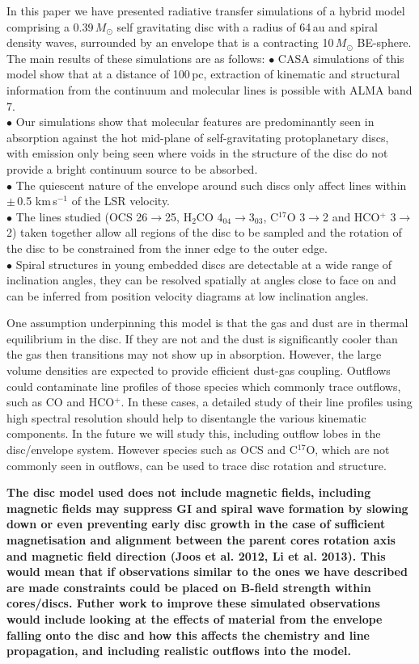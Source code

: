 \documentclass[useAMS,usenatbib]{mn2e}
\begin{document}
In this paper we have presented radiative transfer simulations of a hybrid model comprising a 0.39$\, M_\odot$ self gravitating disc with a radius of 64$\,$au and spiral density waves, surrounded by an envelope that is a contracting 10$\,M_\odot$ BE-sphere. The main results of these simulations are as follows:\newline
$\bullet$ CASA simulations of this model show that at a distance of 100$\,$pc, extraction of kinematic and structural information from the continuum and molecular lines is possible with ALMA band 7.\\
$\bullet$ Our simulations show that molecular features are predominantly seen in absorption against the hot mid-plane of self-gravitating protoplanetary discs, with emission only being seen where voids in the structure of the disc do not provide a bright continuum source to be absorbed.\\
$\bullet$ The quiescent nature of the envelope around such discs only affect lines within $\pm\,$0.5 km$\,$s$^{-1}$ of the LSR velocity.\\
$\bullet$ The lines studied (OCS 26$\rightarrow$25, H$_2$CO 4$_{04}$$\rightarrow$3$_{03}$, C$^{17}$O 3$\rightarrow$2 and HCO$^+$ 3$\rightarrow$2) taken together allow all regions of the disc to be sampled and the rotation of the disc to be constrained from the inner edge to the outer edge.\\
$\bullet$ Spiral structures in young embedded discs are detectable at a wide range of inclination angles, they can be resolved spatially at angles close to face on and can be inferred from position velocity diagrams at low inclination angles.\smallskip


One assumption underpinning this model is that the gas and dust are in thermal equilibrium in the disc. If they are not and the dust is significantly cooler than the gas then transitions may not show up in absorption. However, the large volume densities are expected to provide efficient dust-gas coupling. Outflows could contaminate line profiles of  those species  which commonly trace outflows, such as CO and HCO$^+$. In these cases, a detailed study of their line profiles using high spectral resolution should help to disentangle the various kinematic components.  In the future we will study this, including outflow lobes in the disc/envelope system.  However species such as OCS and C$^{17}$O, which are not commonly seen in outflows, can be used to trace disc rotation and structure.\smallskip


{\bf The disc model used does not include magnetic fields, including magnetic fields may suppress GI and spiral wave formation by slowing down or even preventing early disc growth in the case of sufficient magnetisation and alignment between the parent cores rotation axis and magnetic field direction (Joos et al. 2012, Li et al. 2013). This would mean that if observations similar to the ones we have described are made constraints could be placed on B-field strength within cores/discs. \smallskip Futher work to improve these simulated observations would include looking at the effects of material from the envelope falling onto the disc and how this affects the chemistry and line propagation, and including realistic outflows into the model.}
\end{document}
